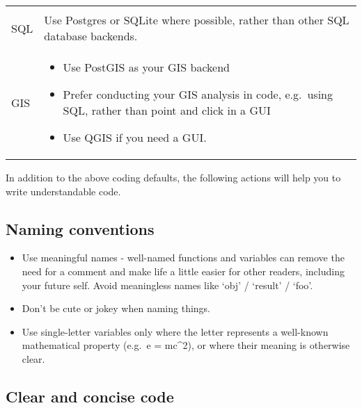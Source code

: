 \documentclass[]{book}
\providecommand{\tightlist}{%
  \setlength{\itemsep}{0pt}\setlength{\parskip}{0pt}}
\begin{document}
\begin{longtable}[]{@{}ll@{}}
\begin{minipage}[t]{0.67\columnwidth}
\end{minipage}\tabularnewline
\begin{minipage}[t]{0.27\columnwidth}\raggedright
SQL\strut
\end{minipage} & \begin{minipage}[t]{0.67\columnwidth}\raggedright
Use Postgres or SQLite where possible, rather than other SQL database backends.\strut
\end{minipage}\tabularnewline
\begin{minipage}[t]{0.27\columnwidth}\raggedright
GIS\strut
\end{minipage} & \begin{minipage}[t]{0.67\columnwidth}\raggedright
\begin{itemize}
\tightlist
\item
  Use PostGIS as your GIS backend
\item
  Prefer conducting your GIS analysis in code, e.g.~using SQL, rather than point and click in a GUI
\item
  Use QGIS if you need a GUI.
\end{itemize}\strut
\end{minipage}\tabularnewline
\bottomrule
\end{longtable}

In addition to the above coding defaults, the following actions will help you to write understandable code.

\hypertarget{names}{%
\subsection*{Naming conventions}\label{names}}

\begin{itemize}
\tightlist
\item
  Use meaningful names - well-named functions and variables can remove the need for a comment and make life a little easier for other readers, including your future self. Avoid meaningless names like `obj' / `result' / `foo'.\\
\item
  Don't be cute or jokey when naming things.
\item
  Use single-letter variables only where the letter represents a well-known mathematical property (e.g.~e = mc\^{}2), or where their meaning is otherwise clear.
\end{itemize}

\hypertarget{ccc}{%
\subsection*{Clear and concise code}\label{ccc}}
\end{document}
